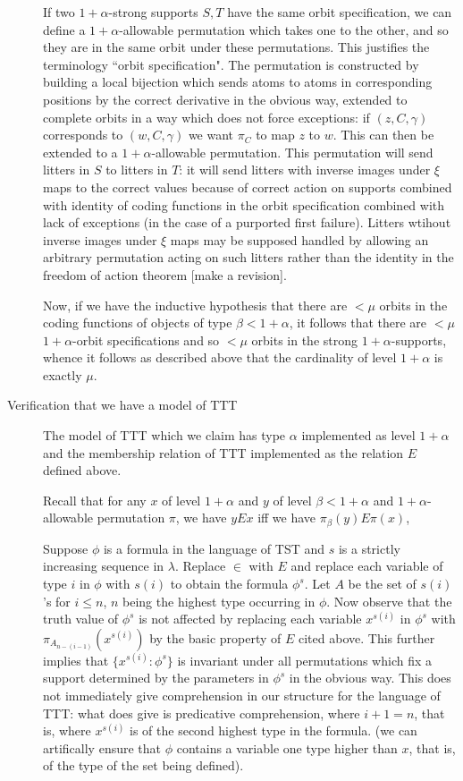 \documentclass[12pt]{article}
\begin{document}
\begin{description}
If two $1+\alpha$-strong supports $S,T$ have the same orbit specification, we can define a $1+\alpha$-allowable permutation which takes one to the other, and so they are in the same orbit
under these permutations.  This justifies the terminology ``orbit specification".  The permutation is constructed by building a local bijection which sends atoms to atoms in corresponding positions by the correct derivative in the obvious way, extended to complete orbits in a way which does not force exceptions:  if $(z,C,\gamma)$ corresponds to $(w,C,\gamma)$ we want
$\pi_C$ to map $z$ to $w$.  This can then be extended to a $1+\alpha$-allowable permutation.  This permutation will send litters in $S$ to litters in $T$:  it will send litters with
inverse images under $\xi$ maps to the correct values because of correct action on supports combined with identity of coding functions in the orbit specification combined with lack of exceptions (in the case of a purported first failure).  Litters wtihout inverse images under $\xi$ maps may be supposed handled by allowing an arbitrary permutation acting on such litters
rather than the identity in the freedom of action theorem [make a revision].

Now, if we have the inductive hypothesis that there are $<\mu$ orbits in the coding functions of objects of type $\beta<1+\alpha$, it follows that there are $<\mu$ $1+\alpha$-orbit specifications and so $<\mu$ orbits in the strong $1+\alpha$-supports, whence it follows as described above that the cardinality of level $1+\alpha$ is exactly $\mu$.

\item[Verification that we have a model of TTT]

The model of TTT which we claim has type $\alpha$ implemented as level $1+\alpha$ and the membership relation of TTT implemented as the relation $E$ defined above.

Recall that for any $x$ of level $1+\alpha$ and $y$ of level $\beta<1+\alpha$ and $1+\alpha$-allowable permutation $\pi$, we have $y E x$ iff we have $\pi_\beta(y) E \pi(x)$,

Suppose $\phi$ is a formula in the language of TST and $s$ is a strictly increasing sequence in $\lambda$.  Replace $\in$ with $E$ and replace each variable of type $i$ in $\phi$ with
$s(i)$ to obtain the formula $\phi^s$.  Let $A$ be the set of $s(i)$'s for $i\leq n$, $n$ being the highest type occurring in $\phi$.   Now observe that the truth value of $\phi^s$ is not
affected by replacing each variable $x^{s(i)}$ in $\phi^s$ with $\pi_{A_{n-(i-1)}}(x^{s(i)})$ by the basic property of $E$ cited above.  This further implies that $\{x^{s(i)}:\phi^s\}$ 
is invariant under all permutations which fix a support determined by the parameters in $\phi^s$ in the obvious way.  This does not immediately give comprehension in our
structure for the language of TTT:  what does give is predicative comprehension, where $i+1=n$, that is, where $x^{s(i)}$ is of the second highest type in the formula. (we can artifically ensure that $\phi$ contains a variable one type higher than $x$, that is, of the type of the set being defined).


\end{description}
\end{document}
